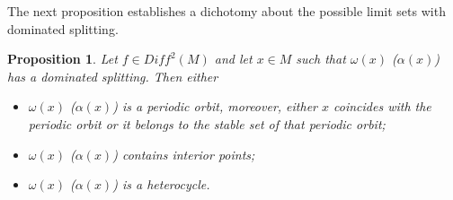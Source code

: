 \documentclass[a4paper,11pt]{article}
\newtheorem{proposition}[lemma]{Proposition}
\theoremstyle{definition}
\def\La{\Lambda}
\def\La{\Lambda}
\begin{document}

    
    

The next proposition establishes a dichotomy about the possible limit sets with dominated splitting.


\begin{proposition}\label{dicho-omega} Let $f\in Diff^2(M)$ and let $x\in M$ such that $\omega(x)$ ($\alpha(x)$) has a dominated splitting. Then either

\begin{itemize}
  

    
    \item[--] $\omega(x)$ ($\alpha(x)$)  is a periodic orbit,  moreover, either  $x$ coincides with   the periodic orbit or it belongs to the stable set of that periodic orbit;

    \item[--] $\omega(x)$ ($\alpha(x)$)  contains interior points;
    
    \item[--] $\omega(x)$ ($\alpha(x)$) is a heterocycle.
    
\end{itemize}
    
\end{proposition}


\end{document}
